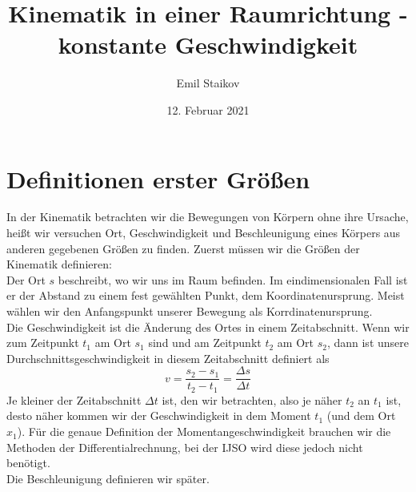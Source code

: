 \documentclass[11pt]{article}
\title{Kinematik in einer Raumrichtung - konstante Geschwindigkeit}
\author{Emil Staikov}
\date{12. Februar 2021}
\begin{document}
\maketitle
\section{Definitionen erster Größen}
In der Kinematik betrachten wir die Bewegungen von Körpern ohne ihre Ursache, heißt wir versuchen Ort, Geschwindigkeit und Beschleunigung eines Körpers aus anderen gegebenen Größen zu finden. Zuerst müssen wir die Größen der Kinematik definieren: \\

Der Ort $s$ beschreibt, wo wir uns im Raum befinden. Im eindimensionalen Fall ist er der Abstand zu einem fest gewählten Punkt, dem Koordinatenursprung. Meist wählen wir den Anfangspunkt unserer Bewegung als Korrdinatenursprung. \\

Die Geschwindigkeit ist die Änderung des Ortes in einem Zeitabschnitt. Wenn wir zum Zeitpunkt $t_1$ am Ort $s_1$ sind und am Zeitpunkt $t_2$ am Ort $s_2$, dann ist unsere Durchschnittsgeschwindigkeit in diesem Zeitabschnitt definiert als
$$ v = \frac{s_2-s_1}{t_2-t_1} = \frac{\Delta s}{\Delta t}$$ 
Je kleiner der Zeitabschnitt $\Delta t$ ist, den wir betrachten, also je näher $t_2$ an $t_1$ ist, desto näher kommen wir der Geschwindigkeit in dem Moment $t_1$ (und dem Ort $x_1$). Für die genaue Definition der Momentangeschwindigkeit brauchen wir die Methoden der Differentialrechnung, bei der IJSO wird diese jedoch nicht benötigt. \\

Die Beschleunigung definieren wir später. \\
\end{document}
